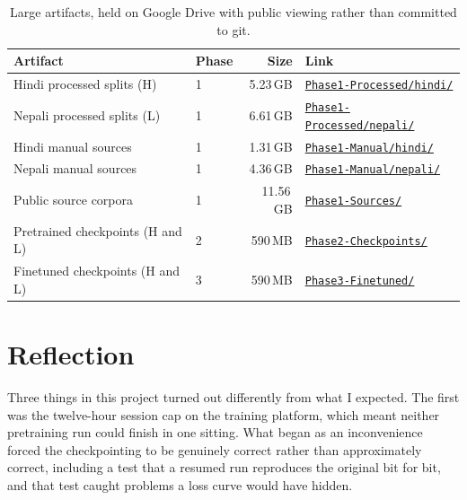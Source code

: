 \documentclass[10pt,a4paper]{article}
\begin{document}
\begin{table}[htbp]
\centering\small
\caption{Large artifacts, held on Google Drive with public viewing rather than committed to git.}
\label{tab:drive}
\begin{tabular}{@{}l l r l@{}}
\toprule
\textbf{Artifact} & \textbf{Phase} & \textbf{Size} & \textbf{Link} \\
\midrule
Hindi processed splits (H)         & 1 & 5.23\,GB & \href{https://drive.google.com/drive/folders/1ggiw-RzYTUgkXLhky2u73tObkw7MKbJT?usp=drive_link}{\texttt{Phase1-Processed/hindi/}} \\
Nepali processed splits (L)        & 1 & 6.61\,GB & \href{https://drive.google.com/drive/folders/1ggiw-RzYTUgkXLhky2u73tObkw7MKbJT?usp=drive_link}{\texttt{Phase1-Processed/nepali/}} \\
Hindi manual sources               & 1 & 1.31\,GB & \href{https://drive.google.com/drive/folders/1ggiw-RzYTUgkXLhky2u73tObkw7MKbJT?usp=drive_link}{\texttt{Phase1-Manual/hindi/}} \\
Nepali manual sources              & 1 & 4.36\,GB & \href{https://drive.google.com/drive/folders/1ggiw-RzYTUgkXLhky2u73tObkw7MKbJT?usp=drive_link}{\texttt{Phase1-Manual/nepali/}} \\
Public source corpora              & 1 & 11.56\,GB & \href{https://drive.google.com/drive/folders/1ggiw-RzYTUgkXLhky2u73tObkw7MKbJT?usp=drive_link}{\texttt{Phase1-Sources/}} \\
Pretrained checkpoints (H and L)   & 2 & 590\,MB  & \href{https://drive.google.com/drive/folders/1YymXv5SGVEQbEtiJTiNZs8Wae7JfpZmk?usp=drive_link}{\texttt{Phase2-Checkpoints/}} \\
Finetuned checkpoints (H and L)    & 3 & 590\,MB  & \href{https://drive.google.com/drive/folders/1DWhTSk7cBxHHVn0_c7qcagOVYeVsIwWI?usp=drive_link}{\texttt{Phase3-Finetuned/}} \\
\bottomrule
\end{tabular}
\end{table}

\section*{Reflection}

Three things in this project turned out differently from what I expected. The
first was the twelve-hour session cap on the training platform, which meant
neither pretraining run could finish in one sitting. What began as an
inconvenience forced the checkpointing to be genuinely correct rather than
approximately correct, including a test that a resumed run reproduces the
original bit for bit, and that test caught problems a loss curve would have
hidden.
\end{document}
